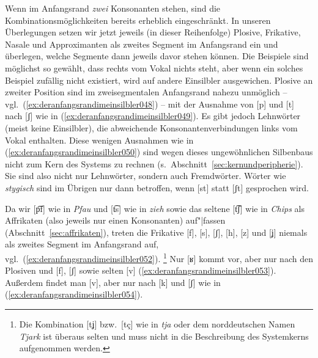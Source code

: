 \Np

\begin{exe}
  \ex\label{ex:deranfangsrandimeinsilbler042}
  \begin{xlist}
  \end{xlist}
\end{exe}

Wenn im Anfangsrand \textit{zwei} Konsonanten stehen, sind die Kombinationsmöglichkeiten bereits erheblich eingeschränkt.
In unseren Überlegungen setzen wir jetzt jeweils (in dieser Reihenfolge) Plosive, Frikative, Nasale und Approximanten als zweites Segment im Anfangsrand ein und überlegen, welche Segmente dann jeweils davor stehen können.
Die Beispiele sind möglichst so gewählt, dass rechts vom Vokal nichts steht, aber wenn ein solches Beispiel zufällig nicht existiert, wird auf andere Einsilbler ausgewichen.
Plosive an zweiter Position sind im zweisegmentalen Anfangsrand nahezu unmöglich -- vgl.\ (\ref{ex:deranfangsrandimeinsilbler048}) -- mit der Ausnahme von [p] und [t] nach [ʃ] wie in (\ref{ex:deranfangsrandimeinsilbler049}).
Es gibt jedoch Lehnwörter (meist keine Einsilbler), die abweichende Konsonantenverbindungen links vom Vokal enthalten.
Diese wenigen Ausnahmen wie in (\ref{ex:deranfangsrandimeinsilbler050}) sind wegen dieses ungewöhnlichen Silbenbaus nicht zum Kern des Systems zu rechnen (s.\ Abschnitt~\ref{sec:kernundperipherie}).
Sie sind also nicht nur Lehnwörter, sondern auch Fremdwörter.
Wörter wie \textit{stygisch} sind im Übrigen nur dann betroffen, wenn [st] statt [ʃt] gesprochen wird.

\begin{exe}
  \ex\label{ex:deranfangsrandimeinsilbler047}
  \begin{xlist}
  \end{xlist}
\end{exe}

Da wir [p͡f] wie in \textit{Pfau} und [t͡s] wie in \textit{zieh} sowie das seltene [t͡ʃ] wie in \textit{Chips} als Affrikaten (also jeweils nur einen Konsonanten) auf"|fassen (Abschnitt~\ref{sec:affrikaten}), treten die Frikative [f], [s], [ʃ], [h], [z] und [ʝ] niemals als zweites Segment im Anfangsrand auf, vgl.\ (\ref{ex:deranfangsrandimeinsilbler052}).%
\footnote{Die Kombination [tʝ] bzw.\ [tç] wie in \textit{tja} oder dem norddeutschen Namen \textit{Tjark} ist überaus selten und muss nicht in die Beschreibung des Systemkerns aufgenommen werden.}
Nur [ʁ] kommt vor, aber nur nach den Plosiven und [f], [ʃ] sowie selten [v] (\ref{ex:deranfangsrandimeinsilbler053}).
Außerdem findet man [v], aber nur nach [k] und [ʃ] wie in (\ref{ex:deranfangsrandimeinsilbler054}).

